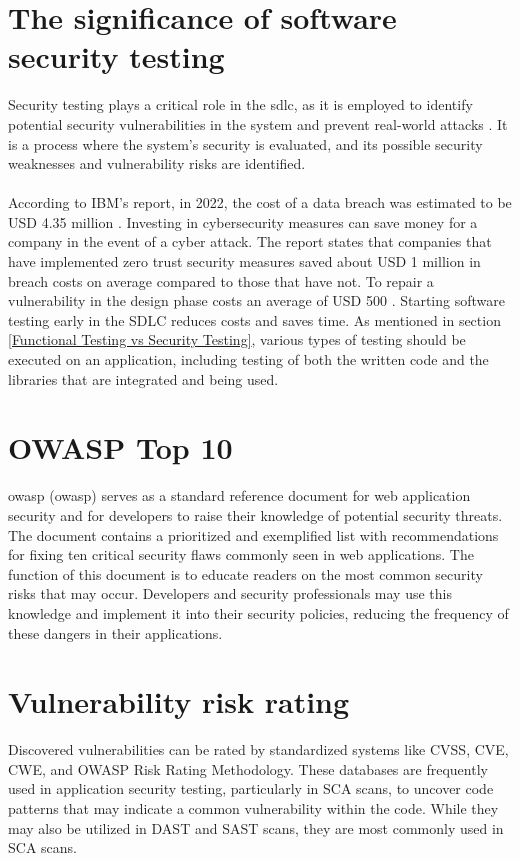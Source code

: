 \section{The significance of software security testing}
Security testing plays a critical role in the \acrlong{sdlc}, as it is employed to identify potential security vulnerabilities in the system and prevent real-world attacks \cite{whysectest}. It is a process where the system's security is evaluated, and its possible security weaknesses and vulnerability risks are identified. 
\\~\\
According to IBM's report, in 2022, the cost of a data breach was estimated to be USD 4.35 million \cite{databreach}. Investing in cybersecurity measures can save money for a company in the event of a cyber attack. The report states that companies that have implemented zero trust security measures saved about USD 1 million in breach costs on average compared to those that have not. To repair a vulnerability in the design phase costs an average of USD 500 \cite{fixvulnerability}. Starting software testing early in the SDLC reduces costs and saves time. As mentioned in section \ref{Functional Testing vs Security Testing}, various types of testing should be executed on an application, including testing of both the written code and the libraries that are integrated and being used.

\section{OWASP Top 10}
\acrlong{owasp} (\acrshort{owasp}) serves as a standard reference document for web application security and for developers to raise their knowledge of potential security threats. The document contains a prioritized and exemplified list with recommendations for fixing ten critical security flaws commonly seen in web applications. The function of this document is to educate readers on the most common security risks that may occur. Developers and security professionals may use this knowledge and implement it into their security policies, reducing the frequency of these dangers in their applications. 




\section{Vulnerability risk rating}
Discovered vulnerabilities can be rated by standardized systems like CVSS, CVE, CWE, and OWASP Risk Rating Methodology. These databases are frequently used in application security testing, particularly in SCA scans, to uncover code patterns that may indicate a common vulnerability within the code. While they may also be utilized in DAST and SAST scans, they are most commonly used in SCA scans. 

